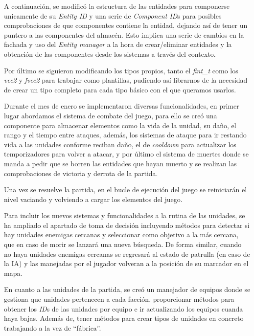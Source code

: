 
A continuación, se modificó la estructura de las entidades para componerse unicamente de su
\textit{Entity ID} y una serie de \textit{Component ID}s para posibles comprobaciones de que
componentes contiene la entidad, dejando así de tener un puntero a las componentes del almacén.
Esto implica una serie de cambios en la fachada y uso del \textit{Entity manager} a la hora
de crear/eliminar entidades y la obtención de las componentes desde los sistemas a través del
contexto. 

Por último se siguieron modificando los tipos propios, tanto el \textit{fint\_t} como
los \textit{vec2} y \textit{fvec2} para trabajar como plantillas, pudiendo así librarnos de
la necesidad de crear un tipo completo para cada tipo básico con el que queramos usarlos.

Durante el mes de enero se implementaron diversas funcionalidades, en primer lugar abordamos
el sistema de combate del juego, para ello se creó una componente para almacenar elementos como
la vida de la unidad, su daño, el rango y el tiempo entre ataques, además, los sistemas de 
ataque para ir restando vida a las unidades conforme reciban daño, el de \textit{cooldown} para
actualizar los temporizadores para volver a atacar, y por último el sistema de muertes donde se
manda a pedir que se borren las entidades que hayan muerto y se realizan las comprobaciones 
de victoria y derrota de la partida.

Una vez se resuelve la partida, en el bucle de ejecución del juego se reiniciarán el nivel
vaciando y volviendo a cargar los elementos del juego.

Para incluir los nuevos sistemas y funcionalidades a la rutina de las unidades, se ha ampliado
el apartado de toma de decisión incluyendo métodos para detectar si hay unidades enemigas 
cercanas y seleccionar como objetivo a la más cercana, que en caso de morir se lanzará una nueva
búsqueda. De forma similar, cuando no haya unidades enemigas cercanas se regresará al estado de
patrulla (en caso de la IA) y las manejadas por el jugador volveran a la posición de su
marcador en el mapa. 

En cuanto a las unidades de la partida, se creó un manejador de equipos donde se gestiona que
unidades pertenecen a cada facción, proporcionar métodos para obtener los \textit{ID}s de las
unidades por equipo e ir actualizando los equipos cuanda haya bajas. Además de, tener métodos
para crear tipos de unidades en concreto trabajando a la vez de ``fábrica''.

